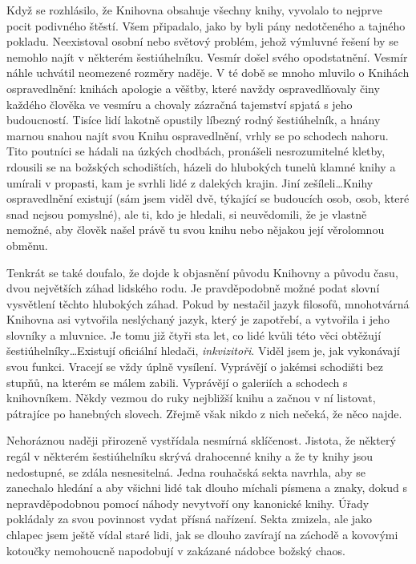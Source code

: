 \documentclass[11pt]{article}
\begin{document}
Když se rozhlásilo, že Knihovna obsahuje všechny knihy, vyvolalo to nejprve pocit podivného štěstí. Všem připadalo, jako by byli pány nedotčeného a tajného pokladu. Neexistoval osobní nebo světový problém, jehož výmluvné řešení by se nemohlo najít v některém šestiúhelníku. Vesmír došel svého opodstatnění. Vesmír náhle uchvátil neomezené rozměry naděje. V té době se mnoho mluvilo o Knihách ospravedlnění: knihách apologie a věštby, které navždy ospravedlňovaly činy každého člověka ve vesmíru a chovaly zázračná tajemství spjatá s jeho budoucností. Tisíce lidí lakotně opustily líbezný rodný šestiúhelník, a hnány marnou snahou najít svou Knihu ospravedlnění, vrhly se po schodech nahoru. Tito poutníci se hádali na úzkých chodbách, pronášeli nesrozumitelné kletby, rdousili se na božských schodištích, házeli do hlubokých tunelů klamné knihy a umírali v propasti, kam je svrhli lidé z dalekých krajin. Jiní zešíleli\dots Knihy ospravedlnění existují (sám jsem viděl dvě, týkající se budoucích osob, osob, které snad nejsou pomyslné), ale ti, kdo je hledali, si neuvědomili, že je vlastně nemožné, aby člověk našel právě tu svou knihu nebo nějakou její věrolomnou obměnu.

Tenkrát se také doufalo, že dojde k objasnění původu Knihovny a původu času, dvou největších záhad lidského rodu. Je pravděpodobně možné podat slovní vysvětlení těchto hlubokých záhad. Pokud by nestačil jazyk filosofů, mnohotvárná Knihovna asi vytvořila neslýchaný jazyk, který je zapotřebí, a vytvořila i jeho slovníky a mluvnice. Je tomu již čtyři sta let, co lidé kvůli této věci obtěžují šestiúhelníky\dots Existují oficiální hledači, \textit{inkvizitoři}. Viděl jsem je, jak vykonávají svou funkci. Vracejí se vždy úplně vysílení. Vyprávějí o jakémsi schodišti bez stupňů, na kterém se málem zabili. Vyprávějí o galeriích a schodech s knihovníkem. Někdy vezmou do ruky nejbližší knihu a začnou v ní listovat, pátrajíce po hanebných slovech. Zřejmě však nikdo z nich nečeká, že něco najde.

Nehoráznou naději přirozeně vystřídala nesmírná sklíčenost. Jistota, že některý regál v některém šestiúhelníku skrývá drahocenné knihy a že ty knihy jsou nedostupné, se zdála nesnesitelná. Jedna rouhačská sekta navrhla, aby se zanechalo hledání a aby všichni lidé tak dlouho míchali písmena a znaky, dokud s nepravděpodobnou pomocí náhody nevytvoří ony kanonické knihy. Úřady pokládaly za svou povinnost vydat přísná nařízení. Sekta zmizela, ale jako chlapec jsem ještě vídal staré lidi, jak se dlouho zavírají na záchodě a kovovými kotoučky nemohoucně napodobují v zakázané nádobce božský chaos.
\end{document}
